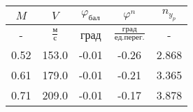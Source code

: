 \begin{tabular}{|c|c|c|c|c|}
\hline
$M$ & $V$ & $\varphi_{бал}$ & $\varphi^{n}$ & $n_{y_{p}}$ \\ 
\hline
- & $\frac{м}{с}$ & град & $\frac{град}{ед.перег.}$ & - \\ 
\hline
0.52 & 153.0 & -0.01 & -0.26 & 2.868 \\ 
\hline
0.61 & 179.0 & -0.01 & -0.21 & 3.365 \\ 
\hline
0.71 & 209.0 & -0.01 & -0.17 & 3.878 \\ 
\hline
\end{tabular}